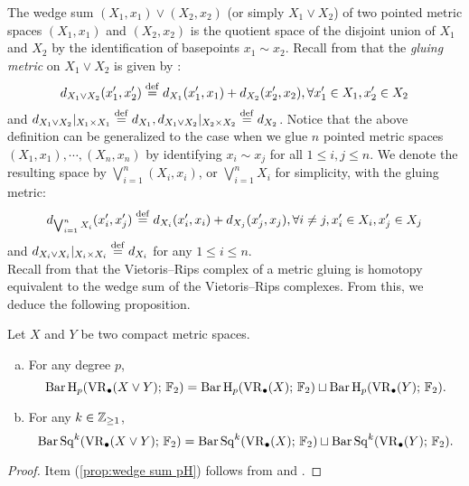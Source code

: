 The wedge sum $(X_1,x_1)\vee (X_2,x_2)$ (or simply $X_1\vee X_2$) of two pointed metric spaces $(X_1,x_1)$ and $(X_2,x_2)$ is the quotient space of the disjoint union of $X_1$ and $X_2$ by the identification of basepoints $x_1\sim x_2$. 
Recall from \cite{burago2001course} that the \emph{gluing metric} on $X_1\vee X_2$ is given by \label{para:gluing}: %
	$$d_{X_1\vee X_2}(x_1',x_2')\stackrel{\mathrm{def}}{=} d_{X_1}(x_1',x_1)+d_{X_2}(x_2',x_2),\forall x_1'\in X_1, x_2'\in X_2$$ 
and $d_{X_1\vee X_2}\vert_{X_1\times X_1}\stackrel{\mathrm{def}}{=} d_{X_1},d_{X_1\vee X_2}\vert_{X_2\times X_2}\stackrel{\mathrm{def}}{=} d_{X_2}$. Notice that the above definition can be generalized to the case when we glue $n$ pointed metric spaces $(X_1,x_1),\cdots,(X_n,x_n)$ by identifying $x_i\sim x_j$ for all $1\leq i,j\leq n$. We denote the resulting space by $\bigvee_{i=1}^n (X_i,x_i)$, or $\bigvee_{i=1}^n X_i$ for simplicity, with the gluing metric:
	$$d_{\bigvee_{i=1}^n X_i}(x_i',x_j')\stackrel{\mathrm{def}}{=} d_{X_i}(x_i',x_i)+d_{X_j}(x_j',x_j),\forall i\neq j, x_i'\in X_i, x_j'\in X_j$$ 
and $d_{X_i\vee X_i}|_{X_i\times X_i}\stackrel{\mathrm{def}}{=} d_{X_i}$ for any $1\leq i\leq n$.\\


Recall from \cite[Proposition 3.7]{adamaszek2020homotopy} that the Vietoris--Rips complex of a metric gluing is homotopy equivalent to the wedge sum of the Vietoris--Rips complexes. From this, we deduce the following proposition. 

\begin{proposition}\label{prop:wedge sum}
Let $X$ and $Y$ be two compact metric spaces.
    \begin{enumerate}[(a)]
        \item\label{prop:wedge sum pH} For any degree $p$,
            \begin{equation*}\label{eq:wedge sum pH}
            \operatorname{Bar} \operatorname{H}_{p}(\operatorname{VR}_\bullet(X\vee Y);\,{\mathbb{F}_2})= \operatorname{Bar} \operatorname{H}_{p}(\operatorname{VR}_\bullet(X);\,{\mathbb{F}_2})\sqcup \operatorname{Bar} \operatorname{H}_{p}(\operatorname{VR}_\bullet(Y);\,{\mathbb{F}_2}).
            \end{equation*}
        \item\label{prop:wedge sum Sq} For any $k\in \mathbb{Z}_{\geq 1}$,
            \begin{equation*}\label{eq:wedge sum Sq}
            \operatorname{Bar}\operatorname{Sq}^{k}(\operatorname{VR}_\bullet(X\vee Y);\,{\mathbb{F}_2})= \operatorname{Bar}\operatorname{Sq}^{k}(\operatorname{VR}_\bullet(X);\,{\mathbb{F}_2})\sqcup \operatorname{Bar}\operatorname{Sq}^{k}(\operatorname{VR}_\bullet(Y);\,{\mathbb{F}_2}).
            \end{equation*}        
    \end{enumerate}
\end{proposition}
\begin{proof}
    Item (\ref{prop:wedge sum pH}) follows from \cite[Proposition 3.7]{adamaszek2020homotopy} and \cite[Thoerem 9 (2)]{lim2020vietoris}. 

\end{proof}

